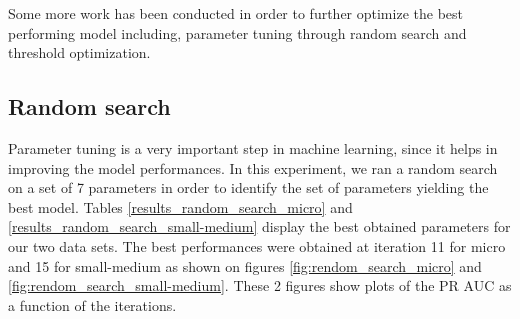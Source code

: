 \documentclass[LaM,binding=0.6cm, english]{sapthesis}
\begin{document}
Some more work has been conducted in order to further optimize the best performing model including, parameter tuning through random search and threshold optimization. 

\subsection{Random search}

Parameter tuning is a very important step in machine learning, since it helps in improving the model performances. In this experiment, we ran a random search on a set of 7 parameters in order to identify the set of parameters yielding the best model. Tables \ref{results_random_search_micro} and \ref{results_random_search_small-medium} display the best obtained parameters for our two data sets. The best performances were obtained at iteration 11 for micro and 15 for small-medium as shown on figures \ref{fig:rendom_search_micro} and \ref{fig:rendom_search_small-medium}. These 2 figures show plots of the PR AUC as a function of the iterations.

\begin{table}[!ht]
\end{table}
\end{document}
